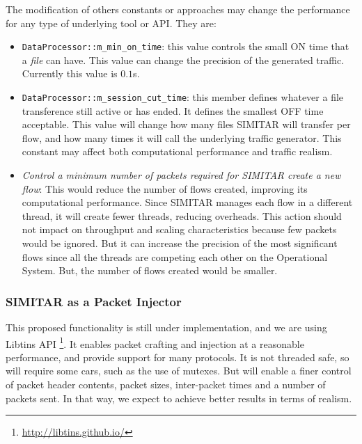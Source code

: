 The modification of others  constants or approaches may change the performance for any type of underlying tool or API. They are:

\begin{itemize}

	\item \texttt{DataProcessor::m\_min\_on\_time}: this value controls the small ON time that a \textit{file} can have. This value  can change the precision of the generated traffic. Currently this value is $0.1$s. 

	\item \texttt{DataProcessor::m\_session\_cut\_time}: this member defines whatever a file transference still active or has ended. It defines the smallest OFF time acceptable. This value will change how many files SIMITAR will transfer per flow, and how many times it will call the underlying traffic generator. This constant may affect both computational performance and traffic realism.

	\item \textit{Control a minimum number of packets required for SIMITAR create a new flow}: This would reduce the number of flows created, improving its computational performance. Since SIMITAR manages each flow in a  different thread, it will create fewer threads, reducing overheads. This action should not impact  on throughput and scaling characteristics because few packets would be ignored. But it can increase the precision of the most significant flows since all the threads are competing each other on the Operational System. But, the number of flows created would be smaller.
	
\end{itemize}




\subsubsection{SIMITAR as a Packet Injector}

This proposed functionality is still under implementation, and we are using Libtins API \footnote{\href{http://libtins.github.io/}{http://libtins.github.io/}}. It enables packet crafting and injection at a reasonable performance, and provide support for many protocols. It is not threaded safe, so will require some cars, such as the use of mutexes. But will enable a finer control of packet header contents, packet sizes, inter-packet times and a number of packets sent. In that way, we expect to achieve better results in terms of realism.



